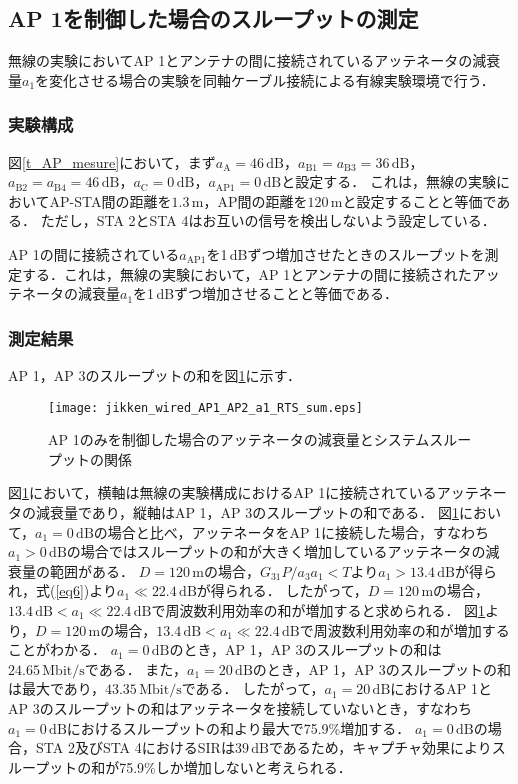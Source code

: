 \documentclass[master]{kuisthesis}		%
\begin{document}
\subsection{AP 1を制御した場合のスループットの測定}\label{AP1制御}
無線の実験においてAP 1とアンテナの間に接続されているアッテネータの減衰量$a_1$を変化させる場合の実験を同軸ケーブル接続による有線実験環境で行う．
\subsubsection{実験構成}
図\ref{t_AP_mesure}において，まず$a_\mathrm{A} = 46\,\mathrm{dB}$，$a_\mathrm{B1} = a_\mathrm{B3} = 36\,\mathrm{dB}$，$a_\mathrm{B2} =a_\mathrm{B4} = 46\,\mathrm{dB}$，$a_\mathrm{C} = 0\,\mathrm{dB}$，$a_\mathrm{AP1} = 0\,\mathrm{dB}$と設定する．
これは，無線の実験においてAP-STA間の距離を$1.3\,\mathrm{m}$，AP間の距離を$120\,\mathrm{m}$と設定することと等価である．
ただし，STA 2とSTA 4はお互いの信号を検出しないよう設定している．

AP 1の間に接続されている$a_\mathrm{AP1}$を1\,dBずつ増加させたときのスループットを測定する．これは，無線の実験において，AP 1とアンテナの間に接続されたアッテネータの減衰量$a_1$を1\,dBずつ増加させることと等価である．

\subsubsection{測定結果}
AP 1，AP 3のスループットの和を図\ref{throughput_a1_RTS_sum}に示す．
\ifnum {}
\begin{figure}[!t]
\centering
\texttt{[image: jikken\_wired\_AP1\_AP2\_a1\_RTS\_sum.eps]}
\caption{AP 1のみを制御した場合のアッテネータの減衰量とシステムスループットの関係}
\label{throughput_a1_RTS_sum}
\end{figure}
\fi
図\ref{throughput_a1_RTS_sum}において，横軸は無線の実験構成におけるAP 1に接続されているアッテネータの減衰量であり，縦軸はAP 1，AP 3のスループットの和である．
図\ref{throughput_a1_RTS_sum}において，$a_1=0\,\mathrm{dB}$の場合と比べ，アッテネータをAP 1に接続した場合，すなわち$a_1>0\,\mathrm{dB}$の場合ではスループットの和が大きく増加しているアッテネータの減衰量の範囲がある．
$D=120\,\mathrm{m}$の場合，$G_{31}P/a_3a_1<T$より$a_1>13.4\,\mathrm{dB}$が得られ，式(\ref{eq6})より$a_1 \ll 22.4\,\mathrm{dB}$が得られる．
したがって，$D=120\,\mathrm{m}$の場合，$13.4\,\mathrm{dB} < a_1 \ll 22.4\,\mathrm{dB}$で周波数利用効率の和が増加すると求められる．
図\ref{throughput_a1_RTS_sum}より，$D=120\,\mathrm{m}$の場合，$13.4\,\mathrm{dB} < a_1 \ll 22.4\,\mathrm{dB}$で周波数利用効率の和が増加することがわかる．
$a_1=0\,\mathrm{dB}$のとき，AP 1，AP 3のスループットの和は$24.65\,\mathrm{Mbit/s}$である．
また，$a_1=20\,\mathrm{dB}$のとき，AP 1，AP 3のスループットの和は最大であり，$43.35\,\mathrm{Mbit/s}$である．
したがって，$a_1=20\,\mathrm{dB}$におけるAP 1とAP 3のスループットの和はアッテネータを接続していないとき，すなわち$a_1=0\,\mathrm{dB}$におけるスループットの和より最大で75.9\%増加する．
$a_1=0\,\mathrm{dB}$の場合，STA 2及びSTA 4におけるSIRは$39\,\mathrm{dB}$であるため，キャプチャ効果によりスループットの和が75.9\%しか増加しないと考えられる．
\end{document}
